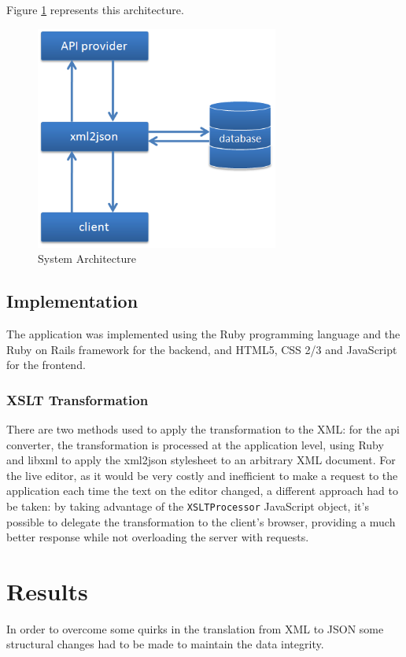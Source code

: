 \documentclass[twocolumn,twoside,10pt,a4paper]{article}
\begin{document}
Figure \ref{fig:system_arch} represents this architecture.

\begin{figure}[h]
    \centering
    \includegraphics[width=80mm]{images/arch.png}
    \caption{System Architecture}
    \label{fig:system_arch}
\end{figure}

\subsection{Implementation}\label{sec:implementation}

The application was implemented using the Ruby programming language and the Ruby on Rails framework for the backend, and HTML5, CSS 2/3 and JavaScript for the frontend.

\subsubsection{XSLT Transformation}\label{sec:xslt-transformation}

There are two methods used to apply the transformation to the XML: for the api converter, the transformation is processed at the application level, using Ruby and libxml to apply the xml2json stylesheet to an arbitrary XML document. For the live editor, as it would be very costly and inefficient to make a request to the application each time the text on the editor changed, a different approach had to be taken: by taking advantage of the \verb!XSLTProcessor! JavaScript object, it's possible to delegate the transformation to the client's browser, providing a much better response while not overloading the server with requests.

\section{Results}\label{sec:results}
In order to overcome some quirks in the translation from XML to JSON some structural changes had to be made to maintain the data integrity.
\end{document}
